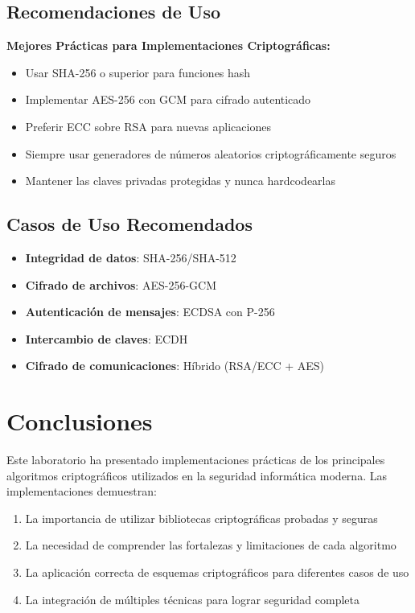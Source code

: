 \documentclass[12pt,a4paper]{article}
\begin{document}
\subsection{Recomendaciones de Uso}

\begin{securitygoodpractice}
	\textbf{Mejores Prácticas para Implementaciones Criptográficas:}
	\begin{itemize}
		\item Usar SHA-256 o superior para funciones hash
		\item Implementar AES-256 con GCM para cifrado autenticado
		\item Preferir ECC sobre RSA para nuevas aplicaciones
		\item Siempre usar generadores de números aleatorios criptográficamente seguros
		\item Mantener las claves privadas protegidas y nunca hardcodearlas
	\end{itemize}
\end{securitygoodpractice}

\subsection{Casos de Uso Recomendados}

\begin{itemize}
	\item \textbf{Integridad de datos}: SHA-256/SHA-512
	\item \textbf{Cifrado de archivos}: AES-256-GCM
	\item \textbf{Autenticación de mensajes}: ECDSA con P-256
	\item \textbf{Intercambio de claves}: ECDH
	\item \textbf{Cifrado de comunicaciones}: Híbrido (RSA/ECC + AES)
\end{itemize}

\section{Conclusiones}

Este laboratorio ha presentado implementaciones prácticas de los principales algoritmos criptográficos utilizados en la seguridad informática moderna. Las implementaciones demuestran:

\begin{enumerate}
	\item La importancia de utilizar bibliotecas criptográficas probadas y seguras
	\item La necesidad de comprender las fortalezas y limitaciones de cada algoritmo
	\item La aplicación correcta de esquemas criptográficos para diferentes casos de uso
	\item La integración de múltiples técnicas para lograr seguridad completa
\end{enumerate}
\end{document}
